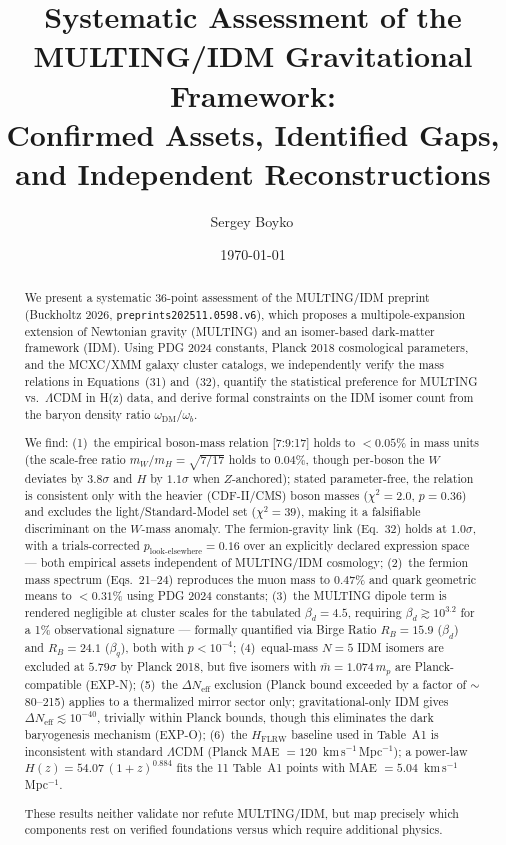 \documentclass[twocolumn,prd,amsmath,amssymb,floatfix]{revtex4-2}
\begin{document}
\title{Systematic Assessment of the MULTING/IDM Gravitational Framework:\\
Confirmed Assets, Identified Gaps, and Independent Reconstructions}

\author{Sergey Boyko\,}
\date{\today}

\begin{abstract}
We present a systematic 36-point assessment of the MULTING/IDM preprint
(Buckholtz 2026, \texttt{preprints202511.0598.v6}), which proposes a
multipole-expansion extension of Newtonian gravity (MULTING) and an
isomer-based dark-matter framework (IDM). Using PDG 2024 constants, Planck 2018
cosmological parameters, and the MCXC/XMM galaxy cluster catalogs, we
independently verify the mass relations in Equations~(31) and~(32), quantify
the statistical preference for MULTING vs.\ $\Lambda$CDM in H(z) data, and
derive formal constraints on the IDM isomer count from the baryon density ratio
$\omega_\mathrm{DM}/\omega_b$.

We find: (1)~the empirical boson-mass relation [7:9:17] holds to $<0.05\%$
in mass units (the scale-free ratio $m_W/m_H = \sqrt{7/17}$ holds to $0.04\%$,
though per-boson the $W$ deviates by $3.8\sigma$ and $H$ by $1.1\sigma$ when
$Z$-anchored); stated parameter-free, the relation is consistent only with the
heavier (CDF-II/CMS) boson masses ($\chi^2 = 2.0$, $p = 0.36$) and excludes the
light/Standard-Model set ($\chi^2 = 39$), making it a falsifiable discriminant
on the $W$-mass anomaly. The fermion-gravity link (Eq.~32) holds at $1.0\sigma$,
with a trials-corrected $p_\mathrm{look\text{-}elsewhere} = 0.16$ over an
explicitly declared expression space
--- both empirical assets independent of MULTING/IDM cosmology; (2)~the fermion mass spectrum
(Eqs.~21--24) reproduces the muon mass to $0.47\%$ and quark geometric means
to $<0.31\%$ using PDG 2024 constants; (3)~the MULTING dipole term is
rendered negligible at cluster scales for the tabulated $\beta_d = 4.5$,
requiring $\beta_d \gtrsim 10^{3.2}$ for a 1\% observational signature ---
formally quantified via Birge Ratio $R_B = 15.9$ ($\beta_d$) and $R_B = 24.1$
($\beta_q$), both with $p < 10^{-4}$;
(4)~equal-mass $N=5$ IDM isomers are excluded at $5.79\sigma$ by Planck 2018,
but five isomers with $\bar{m} = 1.074\,m_p$ are Planck-compatible (EXP-N);
(5)~the $\Delta N_\mathrm{eff}$ exclusion (Planck bound exceeded by a factor
of $\sim$80--215) applies to a thermalized mirror sector only;
gravitational-only IDM gives $\Delta N_\mathrm{eff}
\lesssim 10^{-40}$, trivially within Planck bounds, though this eliminates
the dark baryogenesis mechanism (EXP-O);
(6)~the $H_\mathrm{FLRW}$ baseline used in Table~A1 is inconsistent with standard
$\Lambda$CDM (Planck MAE $= 120$~km\,s$^{-1}$\,Mpc$^{-1}$); a power-law
$H(z) = 54.07\,(1+z)^{0.884}$ fits the 11 Table~A1 points with
MAE $= 5.04$~km\,s$^{-1}$\,Mpc$^{-1}$.

These results neither validate nor refute MULTING/IDM, but map precisely which
components rest on verified foundations versus which require additional physics.
\end{abstract}
\end{document}
